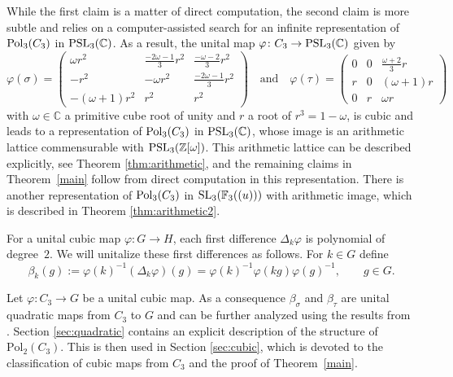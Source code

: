 \documentclass[11pt, a4paper]{amsproc}
\newcommand{\C}{\mathbb{C}}
\newcommand{\F}{\mathbb{F}}
\theoremstyle{remark}
\theoremstyle{plain}
\begin{document}
While the first claim is a matter of direct computation, the second claim is more subtle and relies on a computer-assisted search for an infinite representation of ${\rm Pol}_3(C_3)$ in ${\rm PSL}_3(\mathbb C)$. As a result, the unital map $\varphi \colon C_3 \to {\rm PSL}_3(\mathbb C)$ given by 
\[
\varphi(\sigma)=
\begin{pmatrix}
\omega r^2 & \frac{-2\omega-1}{3}r^2 & \frac{-\omega-2}{3}r^2\\
-r^2 & -\omega r^2 & \frac{-2\omega-1}{3}r^2\\
-(\omega+1)r^2 & r^2 & r^2
\end{pmatrix}
\quad \mbox{and} \quad
\varphi(\tau)=
\begin{pmatrix}
0 & 0 & \frac{\omega+2}{3}r\\
 r & 0 & (\omega+1)r\\
0 & r & \omega r
\end{pmatrix}
\]
with $\omega\in\C$ a primitive cube root of unity and $r$ a root of $r^3=1-\omega$, is cubic and leads to a representation of ${\rm Pol}_3(C_3)$ in ${\rm PSL}_3(\mathbb C)$, whose image is an arithmetic lattice commensurable with ${\rm PSL}_3(\mathbb Z[\omega])$. This arithmetic lattice can be described explicitly, see Theorem \ref{thm:arithmetic}, and the remaining claims in Theorem~\ref{main} follow from direct computation in this representation. There is another representation of ${\rm Pol}_3(C_3)$ in ${\rm SL}_3(\F_3((u)))$ with arithmetic image, which is described in Theorem \ref{thm:arithmetic2}.

\medskip

For a unital cubic map $\varphi:G\to H$, each first difference $\Delta_k\varphi$ is polynomial of degree~$2$.
We will unitalize these first differences as follows.
For $k\in G$ define
\begin{equation}\label{eq:beta-definition}
\beta_k(g):=\varphi(k)^{-1}(\Delta_k\varphi)(g)=\varphi(k)^{-1}\varphi(kg)\varphi(g)^{-1},\qquad g\in G.
\end{equation}

Let $\varphi \colon C_3 \to G$ be a unital cubic map. As a consequence $\beta_{\sigma}$ and $\beta_{\tau}$ are unital quadratic maps from $C_3$ to $G$ and can be further analyzed using the results from \cite{AJ}. Section \ref{sec:quadratic} contains an explicit description of the structure of $\mathrm{Pol}_2(C_3)$. This is then used in Section \ref{sec:cubic}, which is devoted to the classification of cubic maps from $C_3$ and the proof of Theorem~\ref{main}. 
\end{document}
